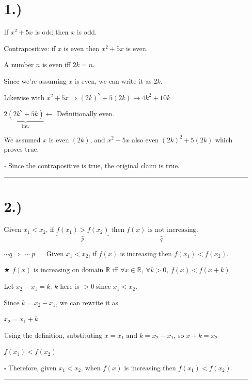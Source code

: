\documentclass[11pt]{article}
\begin{document}
\section*{1.)}

If $x^2 + 5x$ is odd then $x$ is odd.

Contrapositive: if $x$ is even then $x^2 + 5x$ is even.

A number $n$ is even iff $2k = n$.

Since we're assuming $x$ is even, we can write it as $2k$.

Likewise with $x^2 + 5x \Rightarrow (2k)^2 + 5(2k) \to 4k^2 + 10k$

$2\underbrace{(2k^2 + 5k)}_{\text{int.}} \leftarrow$ Definitionally even.

We assumed $x$ is even $(2k)$, and $x^2 + 5x$ also even $(2k)^2 + 5(2k)$ which proves true.

\hfill $\square$ \quad Since the contrapositive is true, the original claim is true.

\bigskip\hrule\bigskip

\section*{2.)}

Given $x_1 < x_2$, if $\underbrace{f(x_1) > f(x_2)}_{p}$ then $\underbrace{f(x) \text{ is not increasing}}_{q}$.

$\sim q \Rightarrow \sim p =$ Given $x_1 < x_2$, if $f(x)$ is increasing then $f(x_1) < f(x_2)$.

$\bigstar$ $f(x)$ is increasing on domain $\mathbb{R}$ iff $\forall x \in \mathbb{R},\ \forall k > 0,\ f(x) < f(x + k)$.

Let $x_2 - x_1 = k$. $k$ here is $> 0$ since $x_1 < x_2$.

Since $k = x_2 - x_1$, we can rewrite it as

$x_2 = x_1 + k$

Using the definition, substituting $x = x_1$ and $k = x_2 - x_1$, so $x + k = x_2$

$f(x_1) < f(x_2)$

\hfill $\square$ \quad Therefore, given $x_1 < x_2$, when $f(x)$ is increasing then $f(x_1) < f(x_2)$.

\bigskip\hrule\bigskip

\end{document}
